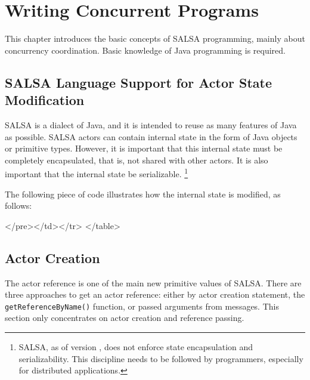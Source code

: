\chapter{Writing Concurrent Programs}
\label{Writing Concurrent Programs}
This chapter introduces the basic concepts of SALSA
programming, mainly about concurrency coordination. 
Basic knowledge of Java programming is required.

\section{SALSA Language Support for Actor State Modification}
\label{SALSA Language Support for Actor State Modification}
SALSA is a dialect of Java, and it is intended to reuse as many 
features of Java as possible. SALSA actors can contain internal state 
in the form of Java objects or primitive types. However, it is important 
that this internal state must be completely encapsulated, that is, not
shared with other actors. It is also important that the internal state
be serializable. 
\footnote{SALSA, as of version \salsaversion, does not enforce 
state encapsulation and serializability. This discipline needs to be 
followed by programmers, especially for distributed applications.}
   
The following piece of code illustrates how
the internal state is modified, as follows:

{\singlespace

}

\begin{htmlonly}

 \begin{rawhtml} 
   </pre></td></tr>
  </table>
\end{rawhtml} 
\end{htmlonly} 


\section{Actor Creation}
\label{Actor Creation}
The actor reference is one of the main new primitive 
values of SALSA. There are three approaches to get an 
actor reference: either by actor creation statement, 
the {\tt getReferenceByName()} function, or passed arguments
from messages. This section only concentrates on actor 
creation and reference passing. 

